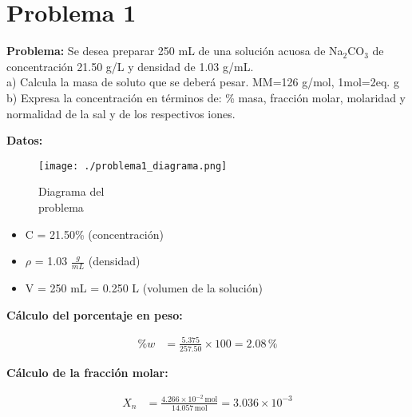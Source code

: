 \documentclass{article}
\begin{document}
\newpage
\section*{Problema 1}





\textbf{Problema:} Se desea preparar 250 mL de una solución acuosa de Na$_2$CO$_3$ de concentración 21.50 g/L y densidad de 1.03 g/mL. \\
a) Calcula la masa de soluto que se deberá pesar. MM=126 g/mol, 1mol=2eq. g \\
b) Expresa la concentración en términos de: \% masa, fracción molar, molaridad y normalidad de la sal y de los respectivos iones.

\noindent\textbf{Datos:} %

\begin{figure}[H]
    \begin{minipage}[t]{0.3\textwidth} %
        \raggedright %
        \texttt{[image: ./problema1\_diagrama.png]} %
        \caption{Diagrama del \\ problema}
    \end{minipage}
\end{figure}

\textbf{} %
\begin{itemize}
\item C = 21.50\% (concentración)
\item $\rho$ = 1.03 $\frac{g}{mL}$ (densidad)
\item V = 250 mL = 0.250 L (volumen de la solución)
\end{itemize}
\textbf{Cálculo del porcentaje en peso:}

\begin{align*}
    \%w &= \frac{5.375}{257.50} \times 100 = 2.08 \, \%
\end{align*}

\textbf{Cálculo de la fracción molar:}

\begin{align*}
    X_n &= \frac{4.266 \times 10^{-2} \, \text{mol}}{14.057 \, \text{mol}} = 3.036 \times 10^{-3}
\end{align*}
\end{document}

